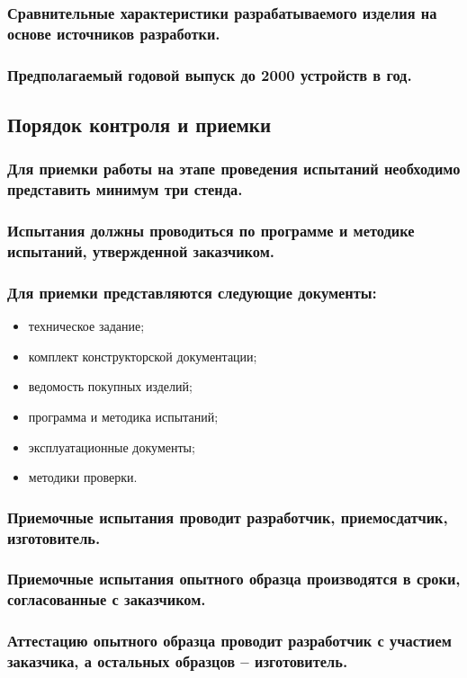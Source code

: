 \documentclass[a4paper]{bsuir-tor}
\begin{document}
\subsubsection{Сравнительные характеристики разрабатываемого
  изделия на основе источников разработки.}

\subsubsection{Предполагаемый годовой выпуск до 2000 устройств в год. }

\subsection{Порядок контроля и приемки}

\subsubsection{Для приемки работы на этапе проведения испытаний
  необходимо представить минимум три стенда.}

\subsubsection{Испытания должны проводиться по программе и методике испытаний,
  утвержденной заказчиком.}

\subsubsection{Для приемки представляются следующие документы:}
\begin{itemize}
\item техническое задание;  
\item комплект конструкторской документации;  
\item ведомость покупных изделий;  
\item программа и методика испытаний;  
\item эксплуатационные документы;  
\item методики проверки.  
\end{itemize}



\subsubsection{Приемочные испытания проводит разработчик,
  приемосдатчик, изготовитель.}

\subsubsection{Приемочные испытания опытного образца производятся в сроки,
  согласованные с заказчиком.}


\subsubsection{Аттестацию опытного образца проводит разработчик
  с участием заказчика,
  а остальных образцов – изготовитель.}
\end{document}
